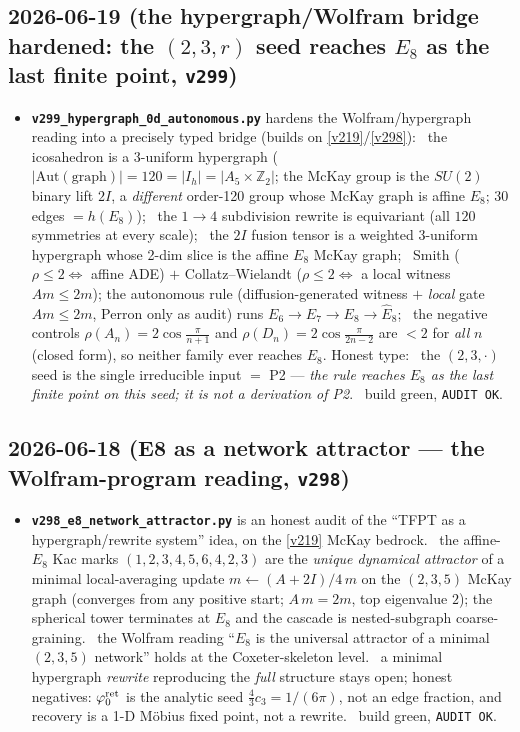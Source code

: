 \subsection*{2026-06-19 (the hypergraph/Wolfram bridge hardened: the $(2,3,r)$ seed reaches $E_8$ as the last finite point, \texttt{v299})}
\begin{itemize}
\item \textbf{\texttt{v299\_hypergraph\_0d\_autonomous.py}} hardens the Wolfram/hypergraph reading into a precisely
  typed bridge (builds on \vref{v219}/\vref{v298}): \mE\ the icosahedron is a 3-uniform hypergraph
  ($|\mathrm{Aut(graph)}|=120=|I_h|=|A_5{\times}\mathbb{Z}_2|$; the McKay group is the $SU(2)$ binary lift $2I$, a
  \emph{different} order-120 group whose McKay graph is affine $E_8$; $30$ edges $=h(E_8)$); \mE\ the $1\to4$
  subdivision rewrite is equivariant (all $120$ symmetries at every scale); \mE\ the $2I$ fusion tensor is a
  weighted 3-uniform hypergraph whose 2-dim slice is the affine $E_8$ McKay graph; \mE\ Smith
  ($\rho\le2\Leftrightarrow$ affine ADE) $+$ Collatz--Wielandt ($\rho\le2\Leftrightarrow$ a local witness
  $Am\le2m$); \mE* the autonomous rule (diffusion-generated witness $+$ \emph{local} gate $Am\le2m$, Perron only
  as audit) runs $E_6\to E_7\to E_8\to\hat E_8$; \mE\ the negative controls $\rho(A_n)=2\cos\frac{\pi}{n+1}$ and
  $\rho(D_n)=2\cos\frac{\pi}{2n-2}$ are $<2$ for \emph{all} $n$ (closed form), so neither family ever reaches
  $E_8$. Honest type: \mO\ the $(2,3,\cdot)$ seed is the single irreducible input $=$ P2 --- \emph{the rule
  reaches $E_8$ as the last finite point on this seed; it is not a derivation of P2}. \mE\ build green,
  \texttt{AUDIT OK}.
\end{itemize}

\subsection*{2026-06-18 (E8 as a network attractor --- the Wolfram-program reading, \texttt{v298})}
\begin{itemize}
\item \textbf{\texttt{v298\_e8\_network\_attractor.py}} is an honest audit of the ``TFPT as a hypergraph/rewrite
  system'' idea, on the \vref{v219} McKay bedrock. \mE\ the affine-$E_8$ Kac marks $(1,2,3,4,5,6,4,2,3)$ are the
  \emph{unique dynamical attractor} of a minimal local-averaging update $m\!\leftarrow\!(A{+}2I)/4\,m$ on the
  $(2,3,5)$ McKay graph (converges from any positive start; $A\,m=2m$, top eigenvalue $2$); the spherical tower
  terminates at $E_8$ and the cascade is nested-subgraph coarse-graining. \mC\ the Wolfram reading ``$E_8$ is the
  universal attractor of a minimal $(2,3,5)$ network'' holds at the Coxeter-skeleton level. \mO\ a minimal
  hypergraph \emph{rewrite} reproducing the \emph{full} structure stays open; honest negatives: $\varphi_0^{\mathrm{ret}}$ is the
  analytic seed $\tfrac{4}{3}c_3=1/(6\pi)$, not an edge fraction, and recovery is a 1-D M\"obius fixed point, not
  a rewrite. \mE\ build green, \texttt{AUDIT OK}.
\end{itemize}

